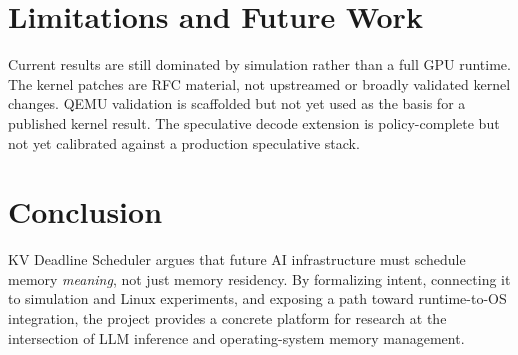 \documentclass[10pt,twocolumn]{article}
\begin{document}
\section{Limitations and Future Work}
\label{sec:limits}

Current results are still dominated by simulation rather than a full GPU runtime. The kernel patches are RFC material, not upstreamed or broadly validated kernel changes. QEMU validation is scaffolded but not yet used as the basis for a published kernel result. The speculative decode extension is policy-complete but not yet calibrated against a production speculative stack.

\section{Conclusion}
\label{sec:conc}

KV Deadline Scheduler argues that future AI infrastructure must schedule memory \emph{meaning}, not just memory residency. By formalizing intent, connecting it to simulation and Linux experiments, and exposing a path toward runtime-to-OS integration, the project provides a concrete platform for research at the intersection of LLM inference and operating-system memory management.
\end{document}
